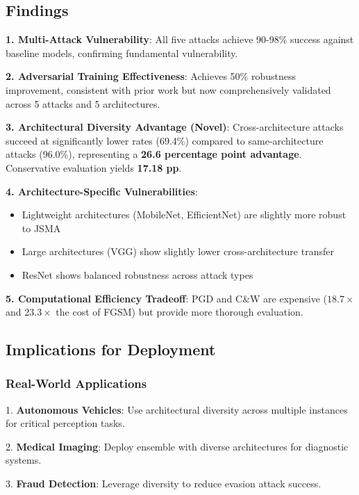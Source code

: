 \documentclass[10pt,conference]{IEEEtran}
\begin{document}
\subsection{Findings}

\textbf{1. Multi-Attack Vulnerability}: All five attacks achieve 90-98\% success against baseline models, confirming fundamental vulnerability.

\textbf{2. Adversarial Training Effectiveness}: Achieves 50\% robustness improvement, consistent with prior work but now comprehensively validated across 5 attacks and 5 architectures.

\textbf{3. Architectural Diversity Advantage (Novel)}: Cross-architecture attacks succeed at significantly lower rates (69.4\%) compared to same-architecture attacks (96.0\%), representing a \textbf{26.6 percentage point advantage}. Conservative evaluation yields \textbf{17.18 pp}.

\textbf{4. Architecture-Specific Vulnerabilities}:
\begin{itemize}
    \item Lightweight architectures (MobileNet, EfficientNet) are slightly more robust to JSMA
    \item Large architectures (VGG) show slightly lower cross-architecture transfer
    \item ResNet shows balanced robustness across attack types
\end{itemize}

\textbf{5. Computational Efficiency Tradeoff}: PGD and C\&W are expensive ($18.7×$ and $23.3×$ the cost of FGSM) but provide more thorough evaluation.

\subsection{Implications for Deployment}

\subsubsection{Real-World Applications}

1. \textbf{Autonomous Vehicles}: Use architectural diversity across multiple instances for critical perception tasks.

2. \textbf{Medical Imaging}: Deploy ensemble with diverse architectures for diagnostic systems.

3. \textbf{Fraud Detection}: Leverage diversity to reduce evasion attack success.
\end{document}
